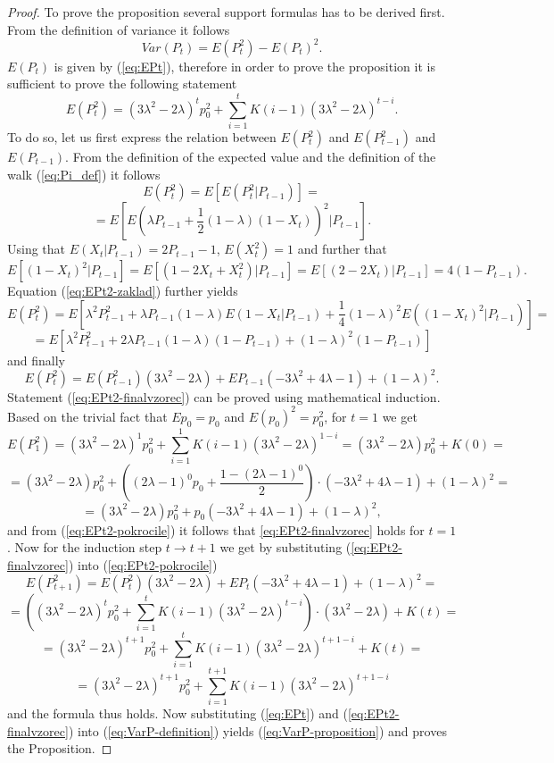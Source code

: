\documentclass{amsart}
\theoremstyle{definition}
\theoremstyle{plain}
\theoremstyle{plain}
\theoremstyle{plain}
\numberwithin{equation}{section}
\begin{document}
\begin{proof}
To prove the proposition several support formulas has to be derived
first. From the definition of variance it follows
\begin{equation}
Var(P_{t})=E(P_{t}^{2})-E(P_{t})^{2}.\label{eq:VarP-definition}
\end{equation}
$E(P_{t})$ is given by (\ref{eq:EPt}), therefore in order to prove
the proposition it is sufficient to prove the following statement
\begin{equation}
E(P_{t}^{2})=(3\lambda^{2}-2\lambda)^{t}p_{0}^{2}+\sum_{i=1}^{t}K(i-1)(3\lambda^{2}-2\lambda)^{t-i}.\label{eq:EPt2-finalvzorec}
\end{equation}
To do so, let us first express the relation between $E(P_{t}^{2})$
and $E(P_{t-1}^{2})$ and $E(P_{t-1}).$ From the definition of the
expected value and the definition of the walk (\ref{eq:Pi_def}) it follows
\[
E(P_{t}^{2})=E[E(P_{t}^{2}|P_{t-1})]=
\]
\begin{equation}
=E[E(\lambda P_{t-1}+\frac{1}{2}(1-\lambda)(1-X_{t}))^{2}|P_{t-1}].\label{eq:EPt2-zaklad}
\end{equation}
Using that $E(X_{t}|P_{t-1})=2P_{t-1}-1$, $E(X_{t}^{2})=1$ and further
that
\[
E[(1-X_{t})^{2}|P_{t-1}]=E[(1-2X_{t}+X_{t}^{2})|P_{t-1}]
=E[(2-2X_{t})|P_{t-1}]= 4(1-P_{t-1}).
\]
Equation (\ref{eq:EPt2-zaklad}) further yields
\[
E(P_{t}^{2})=E[\lambda^{2}P_{t-1}^{2}+\lambda P_{t-1}(1-\lambda)E(1-X_{t}|P_{t-1})+\frac{1}{4}(1-\lambda)^{2}E((1-X_{t})^{2}|P_{t-1})]=
\]
\[
=E[\lambda^{2}P_{t-1}^{2}+2\lambda P_{t-1}(1-\lambda)(1-P_{t-1})+(1-\lambda)^{2}(1-P_{t-1})]
\]
 and finally
\begin{equation}
E(P_{t}^{2})=E(P_{t-1}^{2})(3\lambda^{2}-2\lambda)+EP_{t-1}(-3\lambda^{2}+4\lambda-1)+(1-\lambda)^{2}.\label{eq:EPt2-pokrocile}
\end{equation}
Statement (\ref{eq:EPt2-finalvzorec}) can be proved using mathematical induction.
Based on the trivial fact that $Ep_{0}=p_{0}$ and $E(p_{0})^{2}=p_{0}^{2}$,
for $t=1$ we get
\[
E(P_{1}^{2})=(3\lambda^{2}-2\lambda)^{1}p_{0}^{2}+\sum_{i=1}^{1}K(i-1)(3\lambda^{2}-2\lambda)^{1-i}=(3\lambda^{2}-2\lambda)p_{0}^{2}+K(0)=
\]
\[
=(3\lambda^{2}-2\lambda)p_{0}^{2}+((2\lambda-1)^{0}p_{0}+\frac{1-(2\lambda-1)^{0}}{2})\cdot(-3\lambda^{2}+4\lambda-1)+(1-\lambda)^{2}=
\]
\[
=(3\lambda^{2}-2\lambda)p_{0}^{2}+p_{0}(-3\lambda^{2}+4\lambda-1)+(1-\lambda)^{2},
\]
and from (\ref{eq:EPt2-pokrocile}) it follows that \eqref{eq:EPt2-finalvzorec}
holds for $t=1$. Now for the induction step $t\rightarrow t+1$ we get by substituting
(\ref{eq:EPt2-finalvzorec}) into (\ref{eq:EPt2-pokrocile})
\[
E(P_{t+1}^{2})=E(P_{t}^{2})(3\lambda^{2}-2\lambda)+EP_{t}(-3\lambda^{2}+4\lambda-1)+(1-\lambda)^{2}=
\]
\[
=((3\lambda^{2}-2\lambda)^{t}p_{0}^{2}+\sum_{i=1}^{t}K(i-1)(3\lambda^{2}-2\lambda)^{t-i})\cdot(3\lambda^{2}-2\lambda)+K(t)=
\]
\[
=(3\lambda^{2}-2\lambda)^{t+1}p_{0}^{2}+\sum_{i=1}^{t}K(i-1)(3\lambda^{2}-2\lambda)^{t+1-i}+K(t)=
\]
\[
=(3\lambda^{2}-2\lambda)^{t+1}p_{0}^{2}+\sum_{i=1}^{t+1}K(i-1)(3\lambda^{2}-2\lambda)^{t+1-i}
\]
and the formula thus holds. Now substituting (\ref{eq:EPt}) and (\ref{eq:EPt2-finalvzorec})
into (\ref{eq:VarP-definition}) yields (\ref{eq:VarP-proposition})
and proves the Proposition.
\end{proof}
\end{document}
